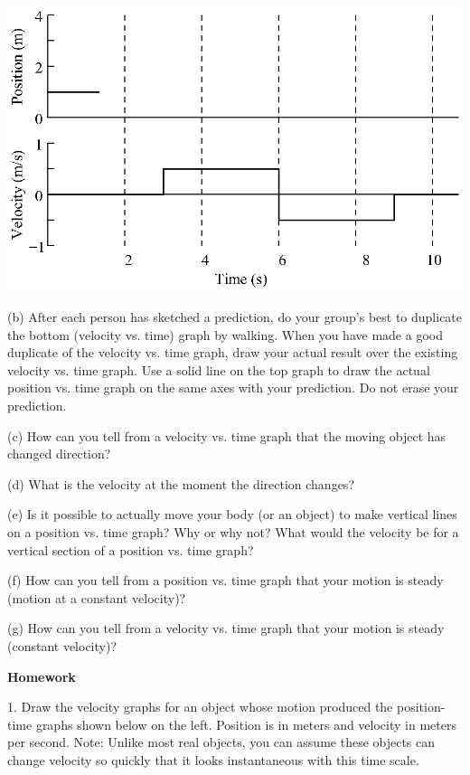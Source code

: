 \vspace{0.3cm}
{\par\centering \includegraphics{relating/relating_fig2.eps} \par}
\answerspace{0.3cm}

(b) After each person has sketched a prediction, do your group's best to duplicate the bottom (velocity vs. time) graph by walking. When you have made a good duplicate of the velocity vs. time graph, draw your actual result over the existing velocity vs. time graph. Use a solid line on the top graph to draw the actual position vs. time graph on the same axes with your prediction. Do not erase your prediction.

(c) How can you tell from a velocity vs. time graph that the moving object has
changed direction?
\answerspace{10mm}

(d) What is the velocity at the moment the direction changes? 
\answerspace{10mm}

(e) Is it possible to actually move your body (or an object) to make vertical
lines on a position vs. time graph? Why or why not? What would the velocity
be for a vertical section of a position vs. time graph? 
\answerspace{10mm}

(f) How can you tell from a position vs. time graph that your motion is steady
(motion at a constant velocity)? 
\answerspace{10mm}

\pagebreak[2]
(g) How can you tell from a velocity vs. time graph that your motion is steady
(constant velocity)? 
\answerspace{20mm}

\textbf{Homework} 

1. Draw the velocity graphs for an object whose motion produced the position-time
graphs shown below on the left. Position is in meters and velocity in meters
per second. Note: Unlike most real objects, you can assume these objects can
change velocity so quickly that it looks instantaneous with this time scale.

